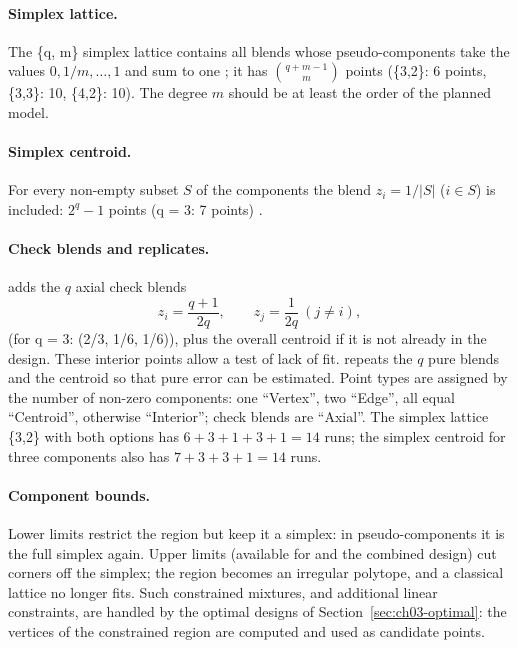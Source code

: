 \paragraph{Simplex lattice.} The \{q, m\} simplex lattice contains all blends whose pseudo-components take the
values $0, 1/m, \dots, 1$ and sum to one \citep{scheffe1958}; it has $\binom{q+m-1}{m}$ points (\{3,2\}: 6 points,
\{3,3\}: 10, \{4,2\}: 10). The degree $m$ should be at least the order of the planned model.

\paragraph{Simplex centroid.} For every non-empty subset $S$ of the components the blend $z_i = 1/|S|$ ($i \in S$)
is included: $2^q - 1$ points (q = 3: 7 points) \citep{cornell2002}.

\paragraph{Check blends and replicates.}  adds the $q$ axial check blends
\begin{equation}
z_i = \frac{q+1}{2q}, \qquad z_j = \frac{1}{2q}\ (j \ne i),
\label{eq:ch03-axialblend}
\end{equation}
(for q = 3: (2/3, 1/6, 1/6)), plus the overall centroid if it is not already in the design. These interior points
allow a test of lack of fit.  repeats the $q$ pure blends and the centroid so that
pure error can be estimated. Point types are assigned by the number of non-zero components: one ``Vertex'', two
``Edge'', all equal ``Centroid'', otherwise ``Interior''; check blends are ``Axial''. The simplex lattice \{3,2\}
with both options has $6 + 3 + 1 + 3 + 1 = 14$ runs; the simplex centroid for three components also has
$7 + 3 + 3 + 1 = 14$ runs.

\paragraph{Component bounds.} Lower limits restrict the region but keep it a simplex: in pseudo-components it is the
full simplex again. Upper limits (available for  and the combined design) cut corners
off the simplex; the region becomes an irregular polytope, and a classical lattice no longer fits. Such constrained
mixtures, and additional linear constraints, are handled by the optimal designs of Section~\ref{sec:ch03-optimal}:
the vertices of the constrained region are computed and used as candidate points.

